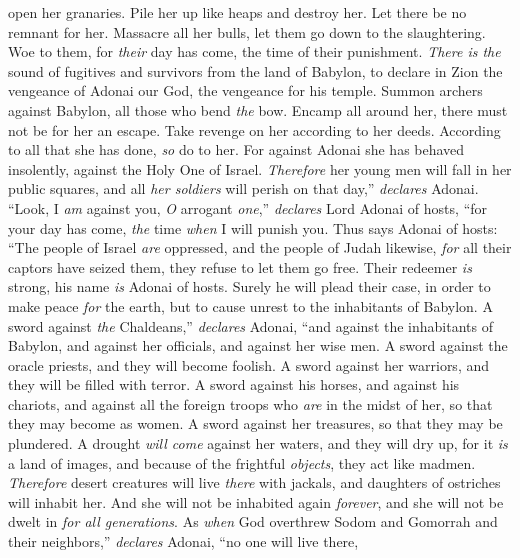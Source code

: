 \begin{biblechapter}
open her granaries. 
Pile her up like heaps and destroy her. 
Let there be no remnant for her.
\verse Massacre all her bulls, 
let them go down to the slaughtering. 
Woe to them, for \textit{their} day has come, 
the time of their punishment.
\verse \textit{There is the} sound of fugitives and survivors 
from the land of Babylon, 
to declare in Zion the vengeance of Adonai our God, 
the vengeance for his temple.
\verse Summon archers against Babylon, 
all those who bend \textit{the} bow. 
Encamp all around her, 
there must not be for her an escape. 
Take revenge on her according to her deeds. 
According to all that she has done, \textit{so} do to her. 
For against Adonai she has behaved insolently, 
against the Holy One of Israel.
\verse \textit{Therefore} her young men will fall in her public squares, 
and all \textit{her soldiers} will perish on that day,” \textit{declares} Adonai.
\verse “Look, I \textit{am} against you, \textit{O} arrogant \textit{one},” 
\textit{declares} Lord Adonai of hosts, 
“for your day has come, 
\textit{the} time \textit{when} I will punish you.
\verse Thus says Adonai of hosts:
\verse “The people of Israel \textit{are} oppressed, 
and the people of Judah likewise, 
\textit{for} all their captors have seized them, 
they refuse to let them go free.
\verse Their redeemer \textit{is} strong, 
his name \textit{is} Adonai of hosts. 
Surely he will plead their case, 
in order to make peace \textit{for} the earth, 
but to cause unrest to the inhabitants of Babylon.
\verse A sword against \textit{the} Chaldeans,” \textit{declares} Adonai, 
“and against the inhabitants of Babylon, 
and against her officials, 
and against her wise men.
\verse A sword against the oracle priests, 
and they will become foolish. 
A sword against her warriors, 
and they will be filled with terror.
\verse A sword against his horses, 
and against his chariots, 
and against all the foreign troops who \textit{are} in the midst of her, 
so that they may become as women. 
A sword against her treasures, 
so that they may be plundered.
\verse A drought \textit{will come} against her waters, 
and they will dry up, 
for it \textit{is} a land of images, 
and because of the frightful \textit{objects}, they act like madmen.
\verse \textit{Therefore} desert creatures will live \textit{there} with jackals, 
and daughters of ostriches will inhabit her. 
And she will not be inhabited again \textit{forever}, 
and she will not be dwelt in \textit{for all generations}.
\verse As \textit{when} God overthrew Sodom and Gomorrah 
and their neighbors,” \textit{declares} Adonai, 
“no one will live there, 

\end{biblechapter}
